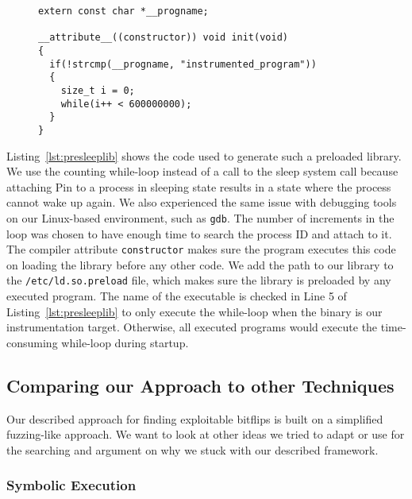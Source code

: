 \begin{figure}
\begin{minipage}{\linewidth}
\begin{lstlisting}[style=CStyle,
                   caption={Code of the preloaded library to keep the process
waiting for some milliseconds, which gives enough time for Pin to attach to the
process.},
label=lst:presleeplib]
extern const char *__progname;

__attribute__((constructor)) void init(void)
{
  if(!strcmp(__progname, "instrumented_program"))
  {
    size_t i = 0;
    while(i++ < 600000000);
  }
}
\end{lstlisting}
\end{minipage}
\end{figure}

Listing~\ref{lst:presleeplib} shows the code used to generate such a preloaded
library. We use the counting while-loop instead of a call to the sleep system
call because attaching Pin to a process in sleeping state results in a state
where the process cannot wake up again. We also experienced the same issue with
debugging tools on our Linux-based environment, such as \texttt{gdb}. The number
of increments in the loop was chosen to have enough time to search the process
ID and attach to it. The compiler attribute \texttt{constructor} makes sure the
program executes this code on loading the library before any other code. We add
the path to our library to the \texttt{/etc/ld.so.preload} file, which makes
sure the library is preloaded by any executed program. The name of the
executable is checked in Line 5 of Listing~\ref{lst:presleeplib} to only
execute the while-loop when the binary is our instrumentation target. Otherwise,
all executed programs would execute the time-consuming while-loop during
startup.

\subsection{Comparing our Approach to other Techniques}

Our described approach for finding exploitable bitflips is built on a simplified
fuzzing-like approach. We want to look at other ideas we tried to adapt or use
for the searching and argument on why we stuck with our described framework.

\subsubsection{Symbolic Execution}

